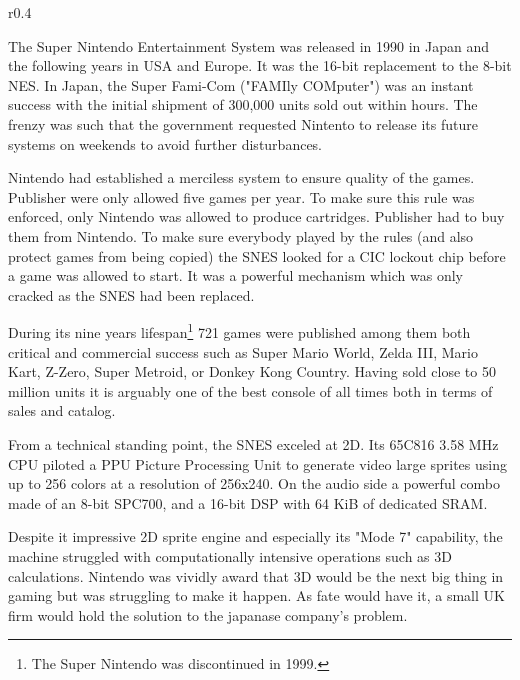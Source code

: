 \begin{wrapfigure}[3]{r}{0.4\textwidth}{
\centering {}}
\end{wrapfigure}
The Super Nintendo Entertainment System was released in 1990 in Japan and the following years in USA and Europe. It was the 16-bit replacement to the 8-bit NES. In Japan, the Super Fami-Com ("FAMIly COMputer") was an instant success with the initial shipment of 300,000 units sold out within hours. The frenzy was such that the government requested Nintento to release its future systems on weekends to avoid further disturbances.\\
\par
Nintendo had established a merciless system to ensure quality of the games. Publisher were only allowed five games per year. To make sure this rule was enforced, only Nintendo was allowed to produce cartridges. Publisher had to buy them from Nintendo. To make sure everybody played by the rules (and also protect games from being copied) the SNES looked for a CIC lockout chip before a game was allowed to start. It was a powerful mechanism which was only cracked as the SNES had been replaced.\\
\par
During its nine years lifespan\footnote{The Super Nintendo was discontinued in 1999.} 721 games were published among them both critical and commercial success such as Super Mario World, Zelda III, Mario Kart, Z-Zero, Super Metroid, or Donkey Kong Country. Having sold close to 50 million units it is arguably one of the best console of all times both in terms of sales and catalog.\\
\par
{}
\par
From a technical standing point, the SNES exceled at 2D. Its 65C816 3.58 MHz CPU piloted a PPU Picture Processing Unit to generate video large sprites using up to 256 colors at a resolution of 256x240. On the audio side a powerful combo made of an 8-bit SPC700, and a 16-bit DSP with 64 KiB of dedicated SRAM.\\
\par

Despite it impressive 2D sprite engine and especially its "Mode 7" capability, the machine struggled with computationally intensive operations such as 3D calculations. Nintendo was vividly award that 3D would be the next big thing in gaming but was struggling to make it happen. As fate would have it, a small UK firm would hold the solution to the japanase company's problem.\\

